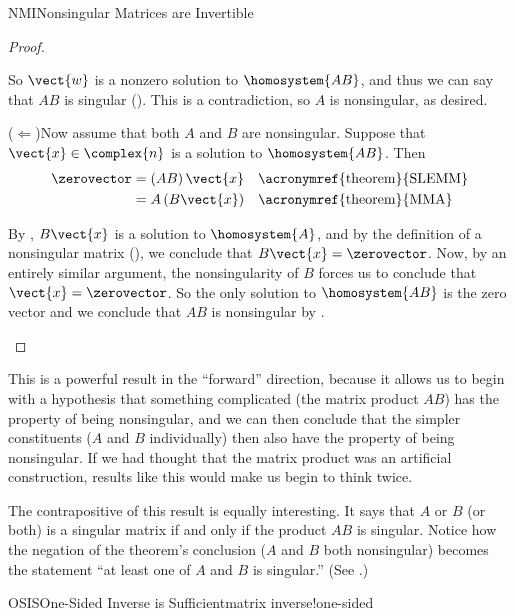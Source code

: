 \begin{subsect}{NMI}{Nonsingular Matrices are Invertible}
\begin{proof}
%
\begin{para}So $\vect{w}$ is a nonzero solution to $\homosystem{AB}$,  and thus we can say  that $AB$ is singular ().  This is a contradiction, so $A$ is nonsingular, as desired.\end{para}
%
\begin{para}($\Leftarrow$)\quad Now assume that both $A$ and $B$ are nonsingular.  Suppose that $\vect{x}\in\complex{n}$ is a solution to $\homosystem{AB}$.  Then
%
\begin{align*}
\zerovector
&=\left(AB\right)\vect{x}&&\text{\acronymref{theorem}{SLEMM}}\\
&=A\left(B\vect{x}\right)&&\text{\acronymref{theorem}{MMA}}
\end{align*}
\end{para}
%
\begin{para}By , $B\vect{x}$ is a solution to $\homosystem{A}$, and by the definition of a nonsingular matrix (), we conclude that $B\vect{x}=\zerovector$.  Now, by an entirely similar argument, the nonsingularity of $B$ forces us to conclude that $\vect{x}=\zerovector$.  So the only solution to $\homosystem{AB}$ is the zero vector and we conclude that $AB$ is nonsingular by .\end{para}
%
\end{proof}
%
\begin{para}This is a powerful result in the ``forward'' direction, because it allows us to begin with a hypothesis that something complicated (the matrix product $AB$) has the property of being nonsingular, and we can then conclude that the simpler constituents ($A$ and $B$ individually) then also have the property of being nonsingular.  If we had thought that the matrix product was an artificial construction, results like this would make us begin to think twice.\end{para}
%
\begin{para}The contrapositive of this result is equally interesting.  It says that $A$ or $B$ (or both) is a singular matrix if and only if the product $AB$ is singular.  Notice how the negation of the theorem's conclusion ($A$ and $B$ both nonsingular) becomes the statement ``at least one of $A$ and $B$ is singular.''  (See .)\end{para}
%
%
\begin{theorem}{OSIS}{One-Sided Inverse is Sufficient}{matrix inverse!one-sided}

\end{theorem}
\end{subsect}
